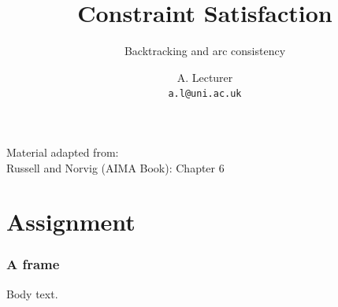 \documentclass{ltx-talk}
\author[A. Lecturer]{A. Lecturer\\ \texttt{a.l@uni.ac.uk}}
\institute[Somewhere]{University of Somewhere}
\title[CSP]{Constraint Satisfaction}
\subtitle{Backtracking and arc consistency}
\date{}
\begin{document}
\begin{frame}
	\maketitle
	\vspace{-1em}
	\begin{center}
		Material adapted from: \\
		Russell and Norvig (AIMA Book): Chapter 6
	\end{center}
\end{frame}
\section{Assignment}
\begin{frame}
\frametitle{A frame}
Body text.
\end{frame}
\end{document}
